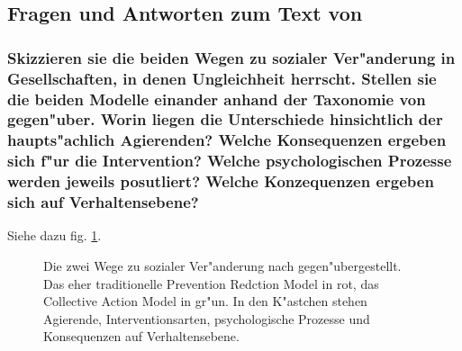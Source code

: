 \subsection{Fragen und Antworten zum Text von \textcite{dixon_beyond_2012}}
\subsubsection{Skizzieren sie die beiden Wegen zu sozialer Ver"anderung in Gesellschaften, in denen Ungleichheit herrscht. Stellen sie die beiden Modelle einander anhand der Taxonomie von \textcite{dixon_beyond_2012} gegen"uber. Worin liegen die Unterschiede hinsichtlich der haupts"achlich Agierenden? Welche Konsequenzen ergeben sich f"ur die Intervention? Welche psychologischen Prozesse werden jeweils posutliert? Welche Konzequenzen ergeben sich auf Verhaltensebene?}

Siehe dazu fig. \ref{fig:dixon1}.

\begin{figure}[hb!]
        \begin{center}
        \end{center}
        \caption{Die zwei Wege zu sozialer Ver"anderung nach \textcite{dixon_beyond_2012} gegen"ubergestellt. Das eher traditionelle Prevention Redction Model in rot, das Collective Action Model in gr"un. In den K"astchen stehen Agierende, Interventionsarten, psychologische Prozesse und Konsequenzen auf Verhaltensebene. }
        \label{fig:dixon1}
\end{figure}

